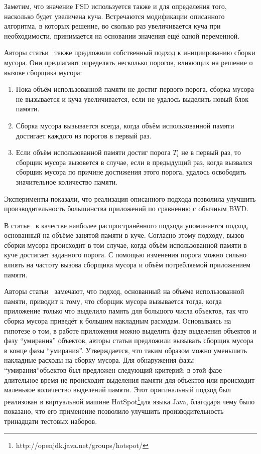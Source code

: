 Заметим, что значение FSD используется также и для определения того, насколько будет увеличена куча.
Встречаются модификации описанного алгоритма, в которых решение, во сколько раз увеличивается куча
при необходимости, принимается на основании значения ещё одной переменной.

Авторы статьи~\cite{BDW} также предложили собственный подход к инициированию сборки мусора.
Они предлагают определять несколько порогов, влияющих на решение о вызове сборщика мусора:
\begin{enumerate}
\item{Пока объём использованной памяти не достиг первого порога, сборка мусора не вызывается и куча
увеличивается, если не удалось выделить новый блок памяти.}
\item{Сборка мусора вызывается всегда, когда объём использованной памяти достигает каждого из
порогов в первый раз.}
\item{Если объём использованной памяти достиг порога $T_i$ не в первый раз, то сборщик мусора
вызовется в случае, если в предыдущий раз, когда вызвался сборщик мусора по причине
достижения этого порога, удалось освободить
значительное количество памяти.}

\end{enumerate}


Эксперименты показали, что реализация описанного подхода позволила улучшить производительность 
большинства приложений по сравнению с обычным BWD.


В статье~\cite{microphase} в качестве наиболее распространённого подхода упоминается 
подход, основанный на объёме занятой памяти в куче.
Согласно этому подходу, вызов сборки мусора происходит в том случае,
когда объём использованной памяти в куче достигает заданного порога. С помощью
изменения порога можно сильно влиять на частоту вызова сборщика мусора и объём потребляемой приложением
памяти.

Авторы статьи~\cite{microphase} замечают, что подход, основанный на объёме 
использованной памяти, приводит к тому, что сборщик мусора вызывается тогда, 
когда приложение только что выделило память для большого числа объектов, так что
сборка мусора приведёт к большим накладным расходам. Основываясь на гипотезе о том, 
в работе приложения можно выделить фазу выделения объектов и фазу ``умирания'' объектов,
авторы статьи предложили вызывать сборщик мусора в конце фазы ``умирания''. Утверждается,
что таким образом можно уменьшить накладные расходы на сборку мусора.
Для обнаружения фазы ``умирания''объектов был предложен следующий критерий: в этой
фазе длительное время не происходит выделения памяти для объектов или происходит маленькое 
количество выделений памяти. Этот оригинальный подход был реализован в виртуальной машине 
HotSpot\footnote{http://openjdk.java.net/groups/hotspot/}для 
языка Java, благодаря чему было показано,
что его применение позволило улучшить производительность тринадцати тестовых наборов. 


